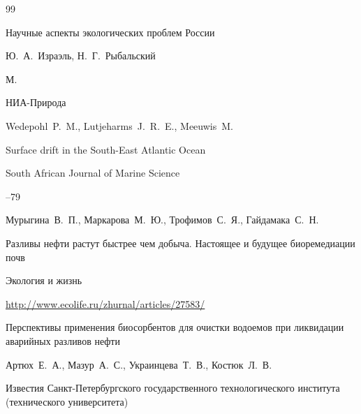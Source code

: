 \RusRef



\begin{thebibliography}{99}




\book Научные аспекты экологических проблем России

\ed Ю.~А.~Израэль, Н.~Г.~Рыбальский

\publaddr М.

\publ НИА-Природа







\by Wedepohl~P.~M., Lutjeharms~J.~R.~E.,  Meeuwis~M.


\paper  Surface drift in the South-East Atlantic Ocean 

\jour  South African Journal of Marine Science



--79





\by Мурыгина~В.~П., Маркарова~М.~Ю., Трофимов~С.~Я., Гайдамака~С.~Н.

\paper Разливы нефти растут быстрее чем добыча. Настоящее и будущее биоремедиации почв

\jour Экология и жизнь


\issueinfo

\url{http://www.ecolife.ru/zhurnal/articles/27583/}




\paper Перспективы применения биосорбентов для очистки водоемов при ликвидации аварийных разливов нефти

\by Артюх~Е.~А., Мазур~А.~С., Украинцева~Т.~В., Костюк~Л.~В.

\jour Известия Санкт-Петербургского государственного технологического института (технического университета)


\end{thebibliography}
